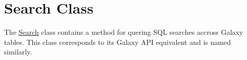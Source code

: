 \hypertarget{group__search__class}{}\section{Search Class}
\label{group__search__class}
The \hyperlink{classSearch}{Search} class contains a method for quering S\+QL searches accross Galaxy tables. This class corresponds to its Galaxy A\+PI equivalent and is named similarly. 